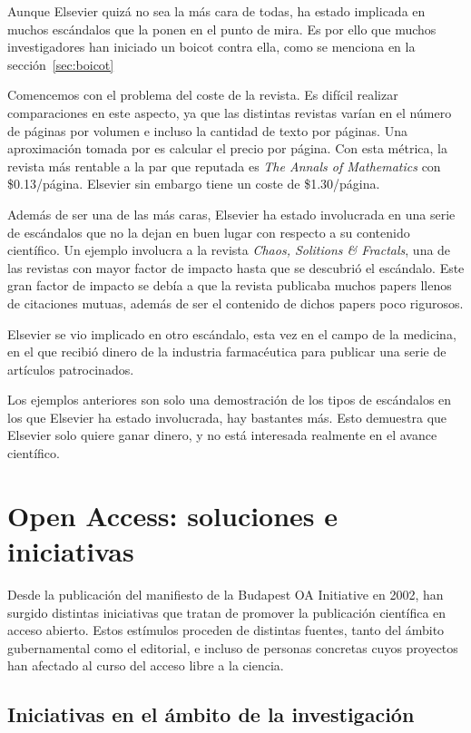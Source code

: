 Aunque Elsevier quizá no sea la más cara de todas, ha estado implicada en muchos escándalos que la ponen en el punto de mira. Es por ello que muchos investigadores han iniciado un boicot contra ella, como se menciona en la sección~\ref{sec:boicot}

Comencemos con el problema del coste de la revista. Es difícil realizar comparaciones en este aspecto, ya que las distintas revistas varían en el número de páginas por volumen e incluso la cantidad de texto por páginas. Una aproximación tomada por \cite{costknowledge} es calcular el precio por página. Con esta métrica, la revista más rentable a la par que reputada es \textit{The Annals of Mathematics} con \$0.13/página. Elsevier sin embargo tiene un coste de \$1.30/página.

Además de ser una de las más caras, Elsevier ha estado involucrada en una serie de escándalos que no la dejan en buen lugar con respecto a su contenido científico. Un ejemplo involucra a la revista \textit{Chaos, Solitions \& Fractals}, una de las revistas con mayor factor de impacto hasta que se descubrió el escándalo. Este gran factor de impacto se debía a que la revista publicaba muchos papers llenos de citaciones mutuas, además de ser el contenido de dichos papers poco rigurosos.

Elsevier se vio implicado en otro escándalo, esta vez en el campo de la medicina, en el que recibió dinero de la industria farmacéutica para publicar una serie de artículos patrocinados.

Los ejemplos anteriores son solo una demostración de los tipos de escándalos en los que Elsevier ha estado involucrada, hay bastantes más. Esto demuestra que Elsevier solo quiere ganar dinero, y no está interesada realmente en el avance científico.

\section{Open Access: soluciones e iniciativas}\label{iniciativas}

Desde la publicación del manifiesto de la Budapest OA Initiative \cite{boai} en 2002, han surgido distintas iniciativas que tratan de promover la publicación científica en acceso abierto. Estos estímulos proceden de distintas fuentes, tanto del ámbito gubernamental como el editorial, e incluso de personas concretas cuyos proyectos han afectado al curso del acceso libre a la ciencia.

\subsection{Iniciativas en el ámbito de la investigación}

